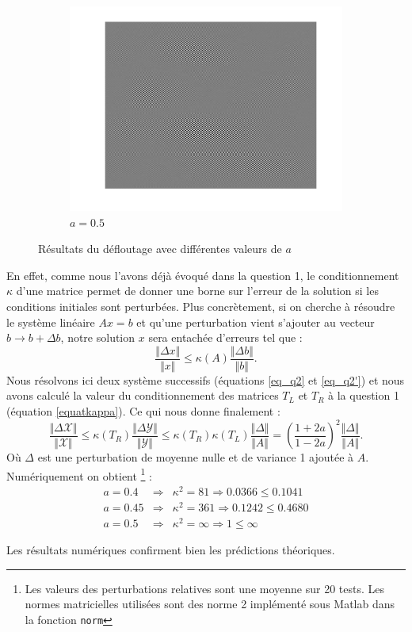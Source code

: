 \begin{figure}
\begin{subfigure}[b]{0.3\textwidth}
    \includegraphics[width=\textwidth]{Q2/unblurred_50.png}
    \caption{$a = 0.5$}
    \label{fig:a5}
  \end{subfigure}
  \caption{Résultats du défloutage avec différentes valeurs de $a$}\label{fig:adiff}
\end{figure}



En effet, comme nous l'avons déjà évoqué dans la question 1, le conditionnement $\kappa$ d'une matrice permet de donner une borne sur l'erreur de la solution si les conditions initiales sont perturbées. Plus concrètement, si on cherche à résoudre le système linéaire $Ax=b$ et qu'une perturbation vient s'ajouter au vecteur $b\rightarrow b+\Delta b$, notre solution $x$ sera entachée d'erreurs tel que : 
$$\frac{\Vert \Delta x \Vert}{\Vert x \Vert} \leq \kappa(A) \frac{\Vert \Delta b \Vert}{\Vert b \Vert}. $$ 
Nous résolvons ici deux système successifs (équations \ref{eq_q2} et \ref{eq_q2'}) et nous avons calculé la valeur du conditionnement des matrices $T_L$ et $T_R$ à la question 1 (équation \ref{equatkappa}). Ce qui nous donne finalement : 
$$\frac{\Vert \Delta \mathcal{X} \Vert}{\Vert \mathcal{X} \Vert} \leq \kappa (T_R) \frac{\Vert \Delta \mathcal{Y} \Vert}{\Vert \mathcal{Y} \Vert} \leq \kappa(T_R) \kappa (T_L) \frac{\Vert \Delta \Vert}{\Vert A \Vert} = \left(\frac{1+2a}{1-2a}\right)^2  \frac{\Vert \Delta \Vert}{\Vert A \Vert}. $$
Où $\Delta$ est une perturbation de moyenne nulle et de variance 1 ajoutée à $A$. Numériquement on obtient \footnote{Les valeurs des perturbations relatives sont une moyenne sur 20 tests. Les normes matricielles utilisées sont des norme 2 implémenté sous Matlab dans la fonction \texttt{norm}} : 
\begin{eqnarray}
a=0.4  &\Longrightarrow & \kappa^2 = 81 \Longrightarrow 0.0366 \leq  0.1041\\
a=0.45  &\Longrightarrow & \kappa^2 = 361 \Longrightarrow  0.1242 \leq  0.4680\\
a=0.5  &\Longrightarrow &  \kappa^2 = \infty \Longrightarrow 1 \leq \infty 
\end{eqnarray}

Les résultats numériques confirment bien les prédictions théoriques.













